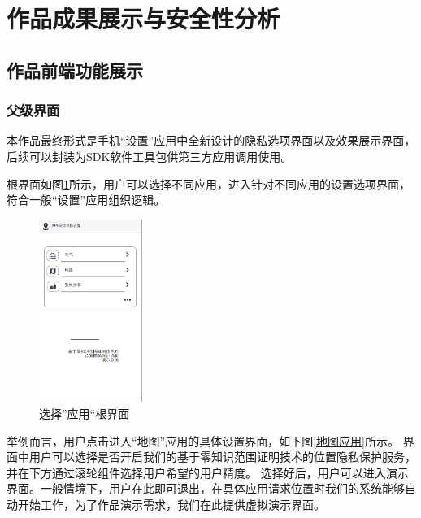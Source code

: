 \documentclass[zihao=-4]{ctexart}
\begin{document}
\section{作品成果展示与安全性分析}
\subsection{作品前端功能展示}
\subsubsection{父级界面}
本作品最终形式是手机“设置”应用中全新设计的隐私选项界面以及效果展示界面，后续可以封装为SDK软件工具包供第三方应用调用使用。
\par
根界面如图\ref{根目录}所示，用户可以选择不同应用，进入针对不同应用的设置选项界面，符合一般“设置”应用组织逻辑。
%
\begin{figure}[H] %
    \centering %
    \includegraphics[width=0.3\textwidth]{前端-1.jpg} %
    \caption{选择”应用“根界面} %
    \label{根目录} %
\end{figure}
\par
举例而言，用户点击进入“地图”应用的具体设置界面，如下图\ref{地图应用}所示。
界面中用户可以选择是否开启我们的基于零知识范围证明技术的位置隐私保护服务，并在下方通过滚轮组件选择用户希望的用户精度。
选择好后，用户可以进入演示界面。一般情境下，用户在此即可退出，在具体应用请求位置时我们的系统能够自动开始工作，为了作品演示需求，我们在此提供虚拟演示界面。
\end{document}
